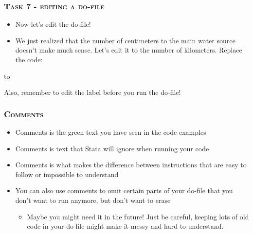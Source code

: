 \documentclass[10pt]{beamer}
\begin{document}
	\begin{frame}
		\frametitle{\textsc{Task 7 - editing a do-file}}
		\begin{itemize}
			\item Now let's edit the do-file!
			\item We just realized that the number of centimeters to the main water source doesn't make much sense. Let's edit it to the number of kilometers. Replace the code:
			\end{itemize}
		
\begin{stlog}\end{stlog}
			to
		
\begin{stlog}\end{stlog}
			Also, remember to edit the label before you run the do-file!
	\end{frame}
	
	\begin{frame}
		\frametitle{\textsc{Comments}}	
		\begin{itemize}	
			\item Comments is the green text you have seen in the code examples
			\item Comments is text that Stata will ignore when running your code
			\item Comments is what makes the difference between instructions that are easy to follow or impossible to understand
			\item You can also use comments to omit certain parts of your do-file that you don't want to run anymore, but don't want to erase
			\begin{itemize}
				\item Maybe you might need it in the future! Just be careful, keeping lots of old code in your do-file might make it messy and hard to understand.
			\end{itemize}
		\end{itemize}
	\end{frame}
	
\end{document}
